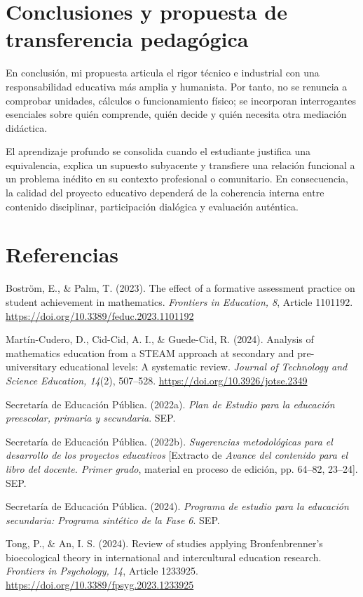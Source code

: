 \documentclass[spanish,letterpaper,oneside]{article}
\begin{document}
\section{Conclusiones y propuesta de transferencia pedagógica}
En conclusión, mi propuesta articula el rigor técnico e industrial con una responsabilidad educativa más amplia y humanista. Por tanto, no se renuncia a comprobar unidades, cálculos o funcionamiento físico; se incorporan interrogantes esenciales sobre quién comprende, quién decide y quién necesita otra mediación didáctica.

El aprendizaje profundo se consolida cuando el estudiante justifica una equivalencia, explica un supuesto subyacente y transfiere una relación funcional a un problema inédito en su contexto profesional o comunitario. En consecuencia, la calidad del proyecto educativo dependerá de la coherencia interna entre contenido disciplinar, participación dialógica y evaluación auténtica.

\section*{Referencias}
{\setlength{\parskip}{6pt}
\par\hangindent=1.27cm  Boström, E., \& Palm, T. (2023). The effect of a formative assessment practice on student achievement in mathematics. \textit{Frontiers in Education, 8}, Article 1101192. \url{https://doi.org/10.3389/feduc.2023.1101192}
\par\hangindent=1.27cm  Martín-Cudero, D., Cid-Cid, A. I., \& Guede-Cid, R. (2024). Analysis of mathematics education from a STEAM approach at secondary and pre-universitary educational levels: A systematic review. \textit{Journal of Technology and Science Education, 14}(2), 507--528. \url{https://doi.org/10.3926/jotse.2349}
\par\hangindent=1.27cm  Secretaría de Educación Pública. (2022a). \textit{Plan de Estudio para la educación preescolar, primaria y secundaria}. SEP.
\par\hangindent=1.27cm  Secretaría de Educación Pública. (2022b). \textit{Sugerencias metodológicas para el desarrollo de los proyectos educativos} [Extracto de \textit{Avance del contenido para el libro del docente. Primer grado}, material en proceso de edición, pp. 64--82, 23--24]. SEP.
\par\hangindent=1.27cm  Secretaría de Educación Pública. (2024). \textit{Programa de estudio para la educación secundaria: Programa sintético de la Fase 6}. SEP.
\par\hangindent=1.27cm  Tong, P., \& An, I. S. (2024). Review of studies applying Bronfenbrenner’s bioecological theory in international and intercultural education research. \textit{Frontiers in Psychology, 14}, Article 1233925. \url{https://doi.org/10.3389/fpsyg.2023.1233925}
}
\end{document}
